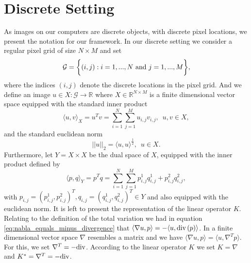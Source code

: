 \documentclass{scrreprt}
\begin{document}
    \section{Discrete Setting} %
    \label{sec:discrete_setting}

        As images on our computers are discrete objects, with discrete pixel locations, we present the notation for our framework. In our discrete setting we consider a regular pixel grid of size $N \times M$ and set
            \begin{equation}
                \mathcal{G} = \bigg\{ (i, j) : i = 1, ..., N \,\, \textnormal{and} \,\, j = 1, ..., M \bigg\},
                \label{eq:pixel_grid}
            \end{equation}
        where the indices $(i, j)$ denote the discrete locations in the pixel grid. And we define an image $u \in X: \mathcal{G} \longrightarrow \mathbb{R}$ where $X \in \mathbb{R}^{N \times M}$ is a finite dimensional vector space equipped with the standard inner product
            \begin{equation}
                \langle u, v \rangle_{X} = u^{T}v = \sum_{i = 1}^{N} \sum_{j = 1}^{M} u_{i, j} v_{i, j}, \,\,\, u, v \in X,
                \label{eq:inner_product}
            \end{equation}
        and the standard euclidean norm
            $$
                ||u||_{2} = \langle u, u \rangle^{\frac{1}{2}}, \,\,\, u \in X.
            $$
        Furthermore, let $Y = X \times X$ be the dual space of $X$, equipped with the inner product defined by
            \begin{equation}
                \langle p, q \rangle_{Y} = p^{T}q = \sum_{i = 1}^{N} \sum_{j = 1}^{M} p^{1}_{i, j} q^{1}_{i, j} + p^{2}_{i, j} q^{2}_{i, j},
                \label{eq:inner_product_space_y}
            \end{equation}
        with $p_{i, j} = \left(p^{1}_{i, j}, p^{2}_{i, j}\right)^{T}, q_{i, j} = \left(q^{1}_{i, j}, q^{2}_{i, j}\right)^{T} \in Y$ and also equipped with the euclidean norm. It is left to present the representation of the linear operator $K$. Relating to the definition of the total variation we had in equation \ref{eq:nabla_equals_minus_divergence} that $\langle \nabla u, p \rangle = - \langle u, \textnormal{div}\,(p) \rangle$. In a finite dimensional vector space $\nabla$ resembles a matrix and we have $\langle \nabla u, p \rangle = \langle u, \nabla^{T} p \rangle$. For this, we set $\nabla^{T} = -\textnormal{div}$. According to the linear operator $K$ we set $K = \nabla$ and $K^{\ast} = \nabla^{T} = -\textnormal{div}$.
\end{document}
